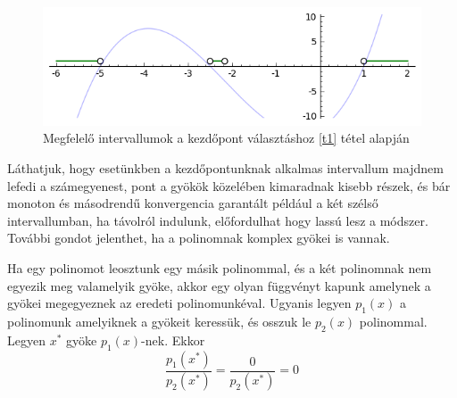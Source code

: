 \documentclass[a4paper,12pt]{report}
\begin{document}
			\begin{figure}[htp]
				\centering
				\includegraphics[scale=0.6]{kep3.png}
				\caption{Megfelelő intervallumok a kezdőpont választáshoz \ref{t1} tétel alapján}\label{k3}
			\end{figure}
			Láthatjuk, hogy esetünkben a kezdőpontunknak alkalmas intervallum majdnem lefedi a számegyenest, pont a gyökök közelében kimaradnak kisebb részek, és bár monoton és másodrendű konvergencia garantált például a két szélső intervallumban, ha távolról indulunk, előfordulhat hogy lassú lesz a módszer. További gondot jelenthet, ha a polinomnak komplex gyökei is vannak. 
			
			Ha egy polinomot leosztunk egy másik polinommal, és a két polinomnak nem egyezik meg valamelyik gyöke, akkor egy olyan függvényt kapunk amelynek a gyökei megegyeznek az eredeti polinomunkéval. Ugyanis legyen $p_1(x)$ a polinomunk amelyiknek a gyökeit keressük, és osszuk le $p_2(x)$ polinommal. Legyen $x^*$ gyöke $p_1(x)$-nek. Ekkor
			\[ \frac{p_1(x^*)}{p_2(x^*)}=\frac{0}{p_2(x^*)}=0\]
			
\end{document}
